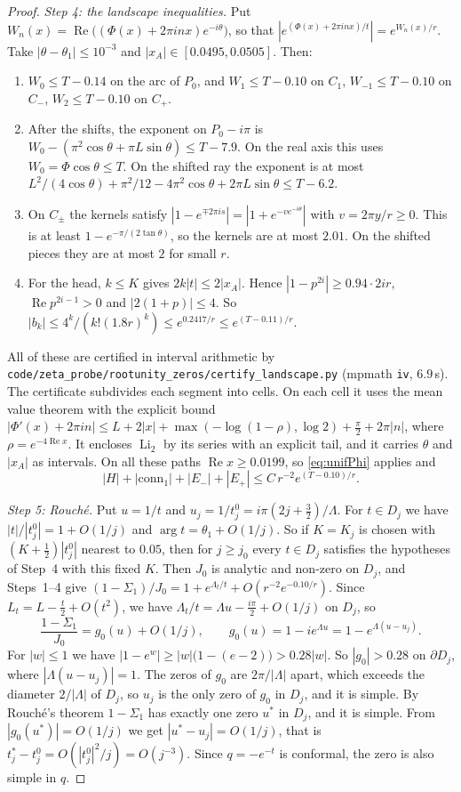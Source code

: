 \documentclass[11pt]{article}
\theoremstyle{plain}
\theoremstyle{definition}
\theoremstyle{remark}
\renewcommand{\Re}{\operatorname{Re}}
\theoremstyle{plain}\newtheorem*{maintheorem}{Main Theorem}
\begin{document}
\begin{proof}
\emph{Step 4: the landscape inequalities.} Put $W_n(x)=\Re\bigl((\Phi(x)+2\pi inx)e^{-i\theta}\bigr)$,
so that $|e^{(\Phi(x)+2\pi inx)/t}|=e^{W_n(x)/r}$. Take $|\theta-\theta_1|\le10^{-3}$ and
$|x_A|\in[0.0495,0.0505]$. Then:
\begin{enumerate}[label=\textup{(\alph*)},leftmargin=2.2em,itemsep=0.1em,topsep=0.2em]
\item $W_0\le T-0.14$ on the arc of $P_0$, and $W_1\le T-0.10$ on $C_1$, $W_{-1}\le T-0.10$ on
$C_-$, $W_2\le T-0.10$ on $C_+$.
\item After the shifts, the exponent on $P_0-i\pi$ is $W_0-(\pi^2\cos\theta+\pi L\sin\theta)\le T-7.9$.
On the real axis this uses $W_0=\Phi\cos\theta\le T$. On the shifted ray the exponent is at most
$L^2/(4\cos\theta)+\pi^2/12-4\pi^2\cos\theta+2\pi L\sin\theta\le T-6.2$.
\item On $C_\pm$ the kernels satisfy $|1-e^{\mp2\pi is}|=|1+e^{-ve^{-i\theta}}|$ with
$v=2\pi y/r\ge0$. This is at least $1-e^{-\pi/(2\tan\theta)}$, so the kernels are at most
$2.01$. On the shifted pieces they are at most $2$ for small $r$.
\item For the head, $k\le K$ gives $2k|t|\le2|x_A|$. Hence $|1-p^{2i}|\ge0.94\cdot2ir$,
$\Re p^{2i-1}>0$ and $|2(1+p)|\le4$. So $|b_k|\le4^k/(k!(1.8r)^k)\le e^{0.2417/r}\le e^{(T-0.11)/r}$.
\end{enumerate}
All of these are certified in interval arithmetic by
\texttt{code/zeta\_probe/rootunity\_zeros/certify\_landscape.py} (mpmath \texttt{iv}, $6.9$\,s).
The certificate subdivides each segment into cells. On each cell it uses the mean value theorem
with the explicit bound
$|\Phi'(x)+2\pi in|\le L+2|x|+\max(-\log(1-\rho),\log2)+\frac\pi2+2\pi|n|$, where
$\rho=e^{-4\Re x}$. It encloses $\operatorname{Li}_2$ by its series with an explicit tail, and it
carries $\theta$ and $|x_A|$ as intervals. On all these paths $\Re x\ge0.0199$, so
\eqref{eq:unifPhi} applies and
\[
   |H|+|\mathrm{conn}_1|+|E_-|+|E_+|\le C\,r^{-2}e^{(T-0.10)/r}.
\]

\emph{Step 5: Rouch\'e.} Put $u=1/t$ and $u_j=1/t^0_j=i\pi(2j+\frac32)/\Lambda$. For
$t\in D_j$ we have $|t|/|t^0_j|=1+O(1/j)$ and $\arg t=\theta_1+O(1/j)$. So if $K=K_j$ is chosen with
$(K+\frac12)|t^0_j|$ nearest to $0.05$, then for $j\ge j_0$ every $t\in D_j$ satisfies the
hypotheses of Step~4 with this fixed $K$. Then $J_0$ is analytic and non-zero on $D_j$, and
Steps~1--4 give $(1-\Sigma_1)/J_0=1+e^{\Lambda_t/t}+O(r^{-2}e^{-0.10/r})$. Since
$L_t=L-\frac t2+O(t^2)$, we have $\Lambda_t/t=\Lambda u-\frac{i\pi}2+O(1/j)$ on $D_j$, so
\[
   \frac{1-\Sigma_1}{J_0}=g_0(u)+O(1/j),\qquad g_0(u)=1-ie^{\Lambda u}=1-e^{\Lambda(u-u_j)} .
\]
For $|w|\le1$ we have $|1-e^w|\ge|w|\bigl(1-(e-2)\bigr)>0.28|w|$. So $|g_0|>0.28$ on $\partial D_j$,
where $|\Lambda(u-u_j)|=1$. The zeros of $g_0$ are $2\pi/|\Lambda|$ apart, which exceeds the diameter
$2/|\Lambda|$ of $D_j$, so $u_j$ is the only zero of $g_0$ in $D_j$, and it is simple. By Rouch\'e's
theorem $1-\Sigma_1$ has exactly one zero $u^\ast$ in $D_j$, and it is simple. From
$|g_0(u^\ast)|=O(1/j)$ we get $|u^\ast-u_j|=O(1/j)$, that is
$t^\ast_j-t^0_j=O(|t^0_j|^2/j)=O(j^{-3})$. Since $q=-e^{-t}$ is conformal, the zero is also simple in $q$.


\end{proof}
\end{document}
